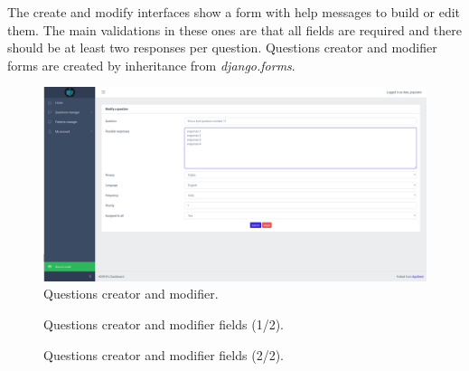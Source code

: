 \documentclass[12pt,english]{article}
\begin{document}
The create and modify interfaces show a form with help messages to build or edit them. The main validations in these ones are that all fields are required and there should be at least two responses per question. Questions creator and modifier forms are created by inheritance from \emph{django.forms}.

\begin{figure}[H]
  \centering
    \includegraphics[width=\textwidth]{questions_modifier.png}
  \caption{Questions creator and modifier.}
\end{figure}

\begin{figure}[H]
    \caption{Questions creator and modifier fields (1/2).}
\end{figure}

\begin{figure}[H]
    \caption{Questions creator and modifier fields (2/2).}
\end{figure}
\end{document}
